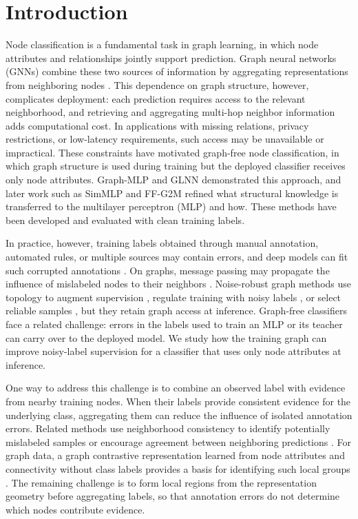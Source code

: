 \documentclass[10pt,letterpaper,nopreprintline]{elsarticle}
\theoremstyle{definition}
\theoremstyle{plain}
\begin{document}
\section{Introduction}\label{sec:1}

Node classification is a fundamental task in graph learning, in which node attributes and relationships jointly support prediction. Graph neural networks (GNNs) combine these two sources of information by aggregating representations from neighboring nodes \cite{ref1}. This dependence on graph structure, however, complicates deployment: each prediction requires access to the relevant neighborhood, and retrieving and aggregating multi-hop neighbor information adds computational cost. In applications with missing relations, privacy restrictions, or low-latency requirements, such access may be unavailable or impractical. These constraints have motivated graph-free node classification, in which graph structure is used during training but the deployed classifier receives only node attributes. Graph-MLP \cite{ref3} and GLNN \cite{ref4} demonstrated this approach, and later work such as SimMLP \cite{ref41} and FF-G2M \cite{ref45} refined what structural knowledge is transferred to the multilayer perceptron (MLP) and how. These methods have been developed and evaluated with clean training labels.

In practice, however, training labels obtained through manual annotation, automated rules, or multiple sources may contain errors, and deep models can fit such corrupted annotations \cite{ref24}. On graphs, message passing may propagate the influence of mislabeled nodes to their neighbors \cite{ref6}. Noise-robust graph methods use topology to augment supervision \cite{ref7}, regulate training with noisy labels \cite{ref8}, or select reliable samples \cite{ref9}, but they retain graph access at inference. Graph-free classifiers face a related challenge: errors in the labels used to train an MLP or its teacher can carry over to the deployed model. We study how the training graph can improve noisy-label supervision for a classifier that uses only node attributes at inference.

One way to address this challenge is to combine an observed label with evidence from nearby training nodes. When their labels provide consistent evidence for the underlying class, aggregating them can reduce the influence of isolated annotation errors. Related methods use neighborhood consistency to identify potentially mislabeled samples or encourage agreement between neighboring predictions \cite{ref10,ref11}. For graph data, a graph contrastive representation learned from node attributes and connectivity without class labels provides a basis for identifying such local groups \cite{ref12}. The remaining challenge is to form local regions from the representation geometry before aggregating labels, so that annotation errors do not determine which nodes contribute evidence.
\end{document}

